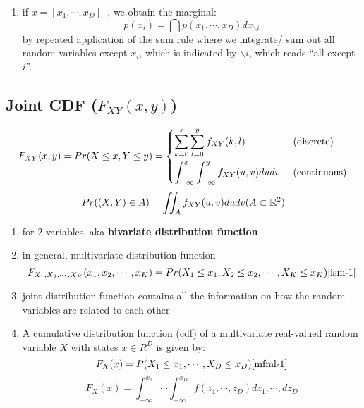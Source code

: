 \begin{enumerate}
    \item if $x = [x_1, \cdots , x_D]^\top$, we obtain the marginal:\cite{mfml-1}
    \[
        p(x_i) = \dint
        p(x_1, \cdots , x_D)dx_{\backslash i}
    \]
    by repeated application of the sum rule where we integrate/ sum out all random variables except $x_i$, which is indicated by $\backslash i$, which reads “all except $i$”.

\end{enumerate}

\subsection{Joint CDF ($F_{XY}(x, y)$) \cite{ism-1,mfml-1}} \label{Multivariate Distributions: joint CDF}

\[
    F_{XY}(x, y)
    = Pr(X \leq x, Y \leq y) 
    = \begin{cases}
        \displaystyle\sum_{k=0}^{x}
        \displaystyle\sum_{l=0}^{y} f_{XY}(k,l) & \text{ (discrete)}\\[3ex]
        \displaystyle\int_{-\infty}^{x}
        \displaystyle\int_{-\infty}^{y} 
        f_{XY}(u,v)dudv & \text{ (continuous)}\\
    \end{cases}
\]
\[
    Pr((X,Y)\in A) 
    = \displaystyle\iint_A f_{XY}(u,v) dudv
    \hfill
    (A \subset \mathbb{R}^2)
\]

\begin{enumerate}
    \item for $2$ variables, aka \textbf{bivariate distribution function}

    \item in general, multivariate distribution function
    \[
        F_{X_1,X_2,\cdots,X_K}(x_1,x_2,\cdots,x_K)
        = Pr(X_1 \leq x_1, X_2 \leq x_2,\cdots,X_K \leq x_K)
        \hfill
        \text{\cite{ism-1}}
    \]

    \item joint distribution function contains all the information on how the random variables are related to each other

    \item A cumulative distribution function (cdf) of a multivariate real-valued random variable $X$ with states $x \in R^D$ is given by: \cite{mfml-1}
    \[
        F_X(x) = P(X_1 \leq x_1, \cdots , X_D \leq x_D)
        \hfill
        \text{\cite{mfml-1}}
    \]
    \[
        \displaystyle
        F_X(x) =
        \int_{-\infty}^{x_1}
        \cdots
        \int_{-\infty}^{x_D}
        f(z_1,\cdots,z_D) dz_1,\cdots,dz_D
    \]
\end{enumerate}

